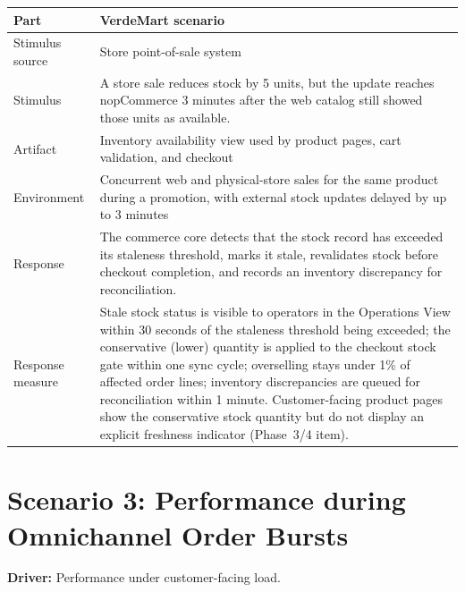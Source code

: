 \begin{center}
\begin{tabular}{|p{}|p{}|}
\hline
\textbf{Part} & \textbf{VerdeMart scenario} \\
\hline
Stimulus source & Store point-of-sale system \\
\hline
Stimulus & A store sale reduces stock by 5 units, but the update reaches nopCommerce 3 minutes after the web catalog still showed those units as available. \\
\hline
Artifact & Inventory availability view used by product pages, cart validation, and checkout \\
\hline
Environment & Concurrent web and physical-store sales for the same product during a promotion, with external stock updates delayed by up to 3 minutes \\
\hline
Response & The commerce core detects that the stock record has exceeded its staleness threshold, marks it stale, revalidates stock before checkout completion, and records an inventory discrepancy for reconciliation. \\
\hline
Response measure & Stale stock status is visible to operators in the Operations View within 30 seconds of the staleness threshold being exceeded; the conservative (lower) quantity is applied to the checkout stock gate within one sync cycle; overselling stays under 1\% of affected order lines; inventory discrepancies are queued for reconciliation within 1 minute. Customer-facing product pages show the conservative stock quantity but do not display an explicit freshness indicator (Phase~3/4 item). \\
\hline
\end{tabular}
\end{center}

\section{Scenario 3: Performance during Omnichannel Order Bursts}

\textbf{Driver:} Performance under customer-facing load.

